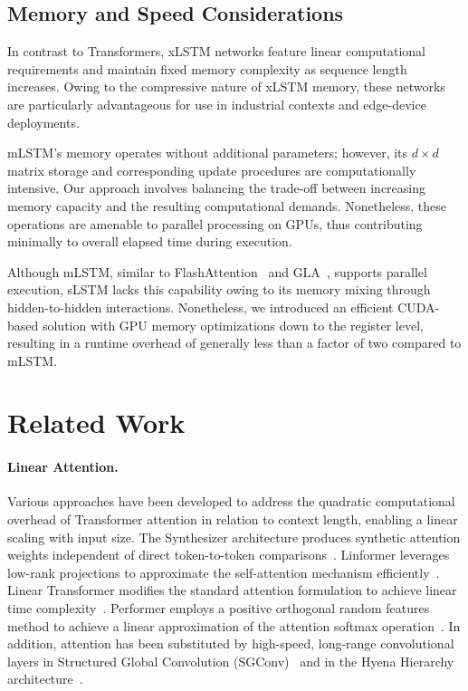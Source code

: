 \subsection{Memory and Speed Considerations}

In contrast to Transformers, xLSTM networks feature linear computational requirements and maintain fixed memory complexity as sequence length increases. Owing to the compressive nature of xLSTM memory, these networks are particularly advantageous for use in industrial contexts and edge-device deployments.

mLSTM’s memory operates without additional parameters; however, its $d \times d$ matrix storage and corresponding update procedures are computationally intensive. Our approach involves balancing the trade-off between increasing memory capacity and the resulting computational demands. Nonetheless, these operations are amenable to parallel processing on GPUs, thus contributing minimally to overall elapsed time during execution.

Although mLSTM, similar to FlashAttention~\citep{Dao:22,Dao:23} and GLA~\citep{Yang:23arxiv}, supports parallel execution, sLSTM lacks this capability owing to its memory mixing through hidden-to-hidden interactions. Nonetheless, we introduced an efficient CUDA-based solution with GPU memory optimizations down to the register level, resulting in a runtime overhead of generally less than a factor of two compared to mLSTM.

\section{Related Work}
\label{sec:related}

\paragraph{Linear Attention.} Various approaches have been developed to address the quadratic computational overhead of Transformer attention in relation to context length, enabling a linear scaling with input size. The Synthesizer architecture produces synthetic attention weights independent of direct token-to-token comparisons~\citep{Tay:20arxiv}. Linformer leverages low-rank projections to approximate the self-attention mechanism efficiently~\citep{Wang:20arxiv}. Linear Transformer modifies the standard attention formulation to achieve linear time complexity~\citep{Katharopoulos:20}. Performer employs a positive orthogonal random features method to achieve a linear approximation of the attention softmax operation~\citep{Choromanski:21}. In addition, attention has been substituted by high-speed, long-range convolutional layers in Structured Global Convolution (SGConv)~\citep{Li:22} and in the Hyena Hierarchy architecture~\citep{Poli:23}.

